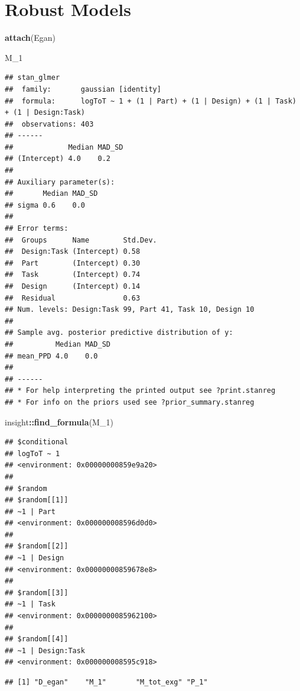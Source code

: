 \documentclass[]{svmono}
\newenvironment{Shaded}{\begin{snugshade}}{\end{snugshade}}
\newcommand{\KeywordTok}[1]{\textcolor[rgb]{0.13,0.29,0.53}{\textbf{#1}}}
\newcommand{\DataTypeTok}[1]{\textcolor[rgb]{0.13,0.29,0.53}{#1}}
\newcommand{\DecValTok}[1]{\textcolor[rgb]{0.00,0.00,0.81}{#1}}
\newcommand{\StringTok}[1]{\textcolor[rgb]{0.31,0.60,0.02}{#1}}
\newcommand{\OperatorTok}[1]{\textcolor[rgb]{0.81,0.36,0.00}{\textbf{#1}}}
\newcommand{\NormalTok}[1]{#1}
\begin{document}
\section{Robust Models}\label{robust-models}

\begin{Shaded}
\begin{Highlighting}[]
\KeywordTok{attach}\NormalTok{(Egan)}

\NormalTok{M_}\DecValTok{1}
\end{Highlighting}
\end{Shaded}

\begin{verbatim}
## stan_glmer
##  family:       gaussian [identity]
##  formula:      logToT ~ 1 + (1 | Part) + (1 | Design) + (1 | Task) + (1 | Design:Task)
##  observations: 403
## ------
##             Median MAD_SD
## (Intercept) 4.0    0.2   
## 
## Auxiliary parameter(s):
##       Median MAD_SD
## sigma 0.6    0.0   
## 
## Error terms:
##  Groups      Name        Std.Dev.
##  Design:Task (Intercept) 0.58    
##  Part        (Intercept) 0.30    
##  Task        (Intercept) 0.74    
##  Design      (Intercept) 0.14    
##  Residual                0.63    
## Num. levels: Design:Task 99, Part 41, Task 10, Design 10 
## 
## Sample avg. posterior predictive distribution of y:
##          Median MAD_SD
## mean_PPD 4.0    0.0   
## 
## ------
## * For help interpreting the printed output see ?print.stanreg
## * For info on the priors used see ?prior_summary.stanreg
\end{verbatim}

\begin{Shaded}
\begin{Highlighting}[]
\NormalTok{insight}\OperatorTok{::}\KeywordTok{find_formula}\NormalTok{(M_}\DecValTok{1}\NormalTok{)}
\end{Highlighting}
\end{Shaded}

\begin{verbatim}
## $conditional
## logToT ~ 1
## <environment: 0x00000000859e9a20>
## 
## $random
## $random[[1]]
## ~1 | Part
## <environment: 0x000000008596d0d0>
## 
## $random[[2]]
## ~1 | Design
## <environment: 0x00000000859678e8>
## 
## $random[[3]]
## ~1 | Task
## <environment: 0x0000000085962100>
## 
## $random[[4]]
## ~1 | Design:Task
## <environment: 0x000000008595c918>
\end{verbatim}

\begin{Shaded}
\end{Shaded}

\begin{verbatim}
## [1] "D_egan"    "M_1"       "M_tot_exg" "P_1"
\end{verbatim}
\end{document}
